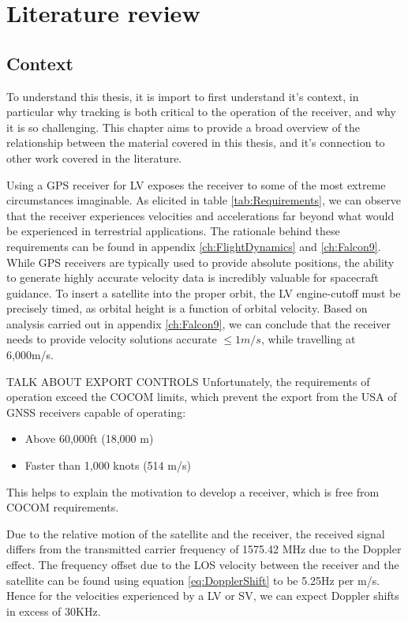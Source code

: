 \chapter{Literature review}\label{ch:LitReview}

\section{Context}
To understand this thesis, it is import to first understand it's context, in particular why tracking is both critical to the operation of the receiver, and why it is so challenging. This chapter aims to provide a broad overview of the relationship between the material covered in this thesis, and it's connection to other work covered in the literature. 

Using a GPS receiver for \ac{LV} exposes the receiver to some of the most extreme circumstances imaginable. As elicited in table \ref{tab:Requirements}, we can observe that the receiver experiences velocities and accelerations far beyond what would be experienced in terrestrial applications. The rationale behind these requirements can be found in appendix \ref{ch:FlightDynamics} and \ref{ch:Falcon9}. 
While \ac{GPS} receivers are typically used to provide absolute positions, the ability to generate highly accurate velocity data is incredibly valuable for spacecraft guidance. To insert a satellite into the proper orbit, the \ac{LV} engine-cutoff must be precisely timed, as orbital height is a function of orbital velocity. Based on analysis carried out in appendix \ref{ch:Falcon9}, we can conclude that the receiver needs to provide velocity solutions accurate $\leq 1m/s$, while travelling at 6,000m/s.



TALK ABOUT EXPORT CONTROLS
Unfortunately, the requirements of operation exceed the \ac{COCOM} limits, which prevent the export from the USA of GNSS receivers capable of operating:

\begin{itemize}
\item{Above 60,000ft (18,000 m)}
\item{Faster than 1,000 knots (514 m/s) }
\end{itemize}

This helps to explain the motivation to develop a receiver, which is free from \ac{COCOM} requirements.

Due to the relative motion of the satellite and the receiver, the received signal differs from the transmitted carrier frequency of 1575.42 MHz due to the Doppler effect\cite{Tsui}. The frequency offset due to the \ac{LOS} velocity between the receiver and the satellite can be found using equation \ref{eq:DopplerShift} to be 5.25Hz per m/s. Hence for the velocities experienced by a  \ac{LV} or \ac{SV}, we can expect Doppler shifts in excess of 30KHz.

